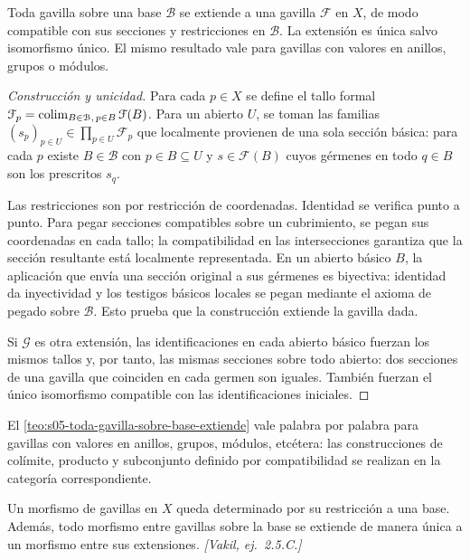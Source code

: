 \begin{teo}
\label{teo:s05-toda-gavilla-sobre-base-extiende}
Toda gavilla sobre una base $\mathcal B$ se extiende a una gavilla $\mathcal F$ en $X$, de modo compatible con sus secciones y restricciones en $\mathcal B$. La extensión es única salvo isomorfismo único. El mismo resultado vale para gavillas con valores en anillos, grupos o módulos.
\end{teo}
\begin{proof}[Construcción y unicidad]
Para cada $p\in X$ se define el tallo formal $\mathcal F_p=\operatorname*{colim}_{B\in\mathcal B,\,p\in B}\mathcal F(B)$. Para un abierto $U$, se toman las familias $(s_p)_{p\in U}\in\prod_{p\in U}\mathcal F_p$ que localmente provienen de una sola sección básica: para cada $p$ existe $B\in\mathcal B$ con $p\in B\subseteq U$ y $s\in\mathcal F(B)$ cuyos gérmenes en todo $q\in B$ son los prescritos $s_q$.

Las restricciones son por restricción de coordenadas. Identidad se verifica punto a punto. Para pegar secciones compatibles sobre un cubrimiento, se pegan sus coordenadas en cada tallo; la compatibilidad en las intersecciones garantiza que la sección resultante está localmente representada. En un abierto básico $B$, la aplicación que envía una sección original a sus gérmenes es biyectiva: identidad da inyectividad y los testigos básicos locales se pegan mediante el axioma de pegado sobre $\mathcal B$. Esto prueba que la construcción extiende la gavilla dada.

Si $\mathcal G$ es otra extensión, las identificaciones en cada abierto básico fuerzan los mismos tallos y, por tanto, las mismas secciones sobre todo abierto: dos secciones de una gavilla que coinciden en cada germen son iguales. También fuerzan el único isomorfismo compatible con las identificaciones iniciales.
\end{proof}

\begin{obs}
\label{obs:s05-teorema-3-1-vale-palabra}
El \cref{teo:s05-toda-gavilla-sobre-base-extiende} vale palabra por palabra para gavillas con valores en anillos, grupos, módulos, etcétera: las construcciones de colímite, producto y subconjunto definido por compatibilidad se realizan en la categoría correspondiente.
\end{obs}

\begin{ejer}
\label{ejer:s05-morfismos-gavillas-sobre-base}
Un morfismo de gavillas en $X$ queda determinado por su restricción a una base. Además, todo morfismo entre gavillas sobre la base se extiende de manera única a un morfismo entre sus extensiones. \emph{[Vakil, ej.~2.5.C.]}
\end{ejer}

